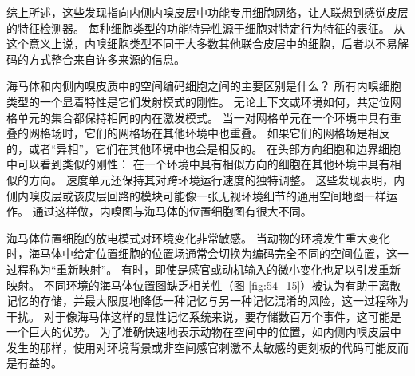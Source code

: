 综上所述，这些发现指向内侧内嗅皮层中功能专用细胞网络，让人联想到感觉皮层的特征检测器。
每种细胞类型的功能特异性源于细胞对特定行为特征的表征。
从这个意义上说，内嗅细胞类型不同于大多数其他联合皮层中的细胞，后者以不易解码的方式整合来自许多来源的信息。


海马体和内侧内嗅皮质中的空间编码细胞之间的主要区别是什么？
所有内嗅细胞类型的一个显着特性是它们发射模式的刚性。
无论上下文或环境如何，共定位网格单元的集合都保持相同的内在激发模式。
当一对网格单元在一个环境中具有重叠的网格场时，它们的网格场在其他环境中也重叠。
如果它们的网格场是相反的，或者“异相”，它们在其他环境中也会是相反的。
在头部方向细胞和边界细胞中可以看到类似的刚性：
在一个环境中具有相似方向的细胞在其他环境中具有相似的方向。
速度单元还保持其对跨环境运行速度的独特调整。
这些发现表明，内侧内嗅皮层或该皮层回路的模块可能像一张无视环境细节的通用空间地图一样运作。
通过这样做，内嗅图与海马体的位置细胞图有很大不同。


海马体位置细胞的放电模式对环境变化非常敏感。
当动物的环境发生重大变化时，海马体中给定位置细胞的位置场通常会切换为编码完全不同的空间位置，这一过程称为“重新映射”。
有时，即使是感官或动机输入的微小变化也足以引发重新映射。
不同环境的海马体位置图缺乏相关性（图 \ref{fig:54_15}）被认为有助于离散记忆的存储，并最大限度地降低一种记忆与另一种记忆混淆的风险，这一过程称为干扰。
对于像海马体这样的显性记忆系统来说，要存储数百万个事件，这可能是一个巨大的优势。
为了准确快速地表示动物在空间中的位置，如内侧内嗅皮层中发生的那样，使用对环境背景或非空间感官刺激不太敏感的更刻板的代码可能反而是有益的。


